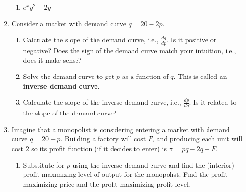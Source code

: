 \begin{CALCULUS}
\begin{enumerate}
\begin{enumerate}
    \item $e^x y^2 - 2y$\ \ 

    \end{enumerate}












\item Consider a market with demand curve $q = 20 - 2p$.

    \begin{enumerate}

    \item Calculate the slope of the demand curve, i.e., $\displaystyle \frac{dq}{dp}$. Is it positive or negative? Does the sign of the demand curve match your intuition, i.e., does it make sense?%


    \item Solve the demand curve to get $p$ as a function of $q$. This is called an \textbf{inverse demand curve}.%


    \item Calculate the slope of the inverse demand curve, i.e., $\displaystyle \frac{dp}{dq}$. Is it related to the slope of the demand curve?

    \end{enumerate}






\item Imagine that a monopolist is considering entering a market with demand curve $q = 20 - p$. Building a factory will cost $F$, and producing each unit will cost $2$ so its profit function (if it decides to enter) is $\pi = pq - 2q - F$.

    \begin{enumerate}

    \item Substitute for $p$ using the inverse demand curve and find the (interior) profit-maximizing level of output for the monopolist. Find the profit-maximizing price and the profit-maximizing profit level.


\end{enumerate}
\end{enumerate}
\end{CALCULUS}
